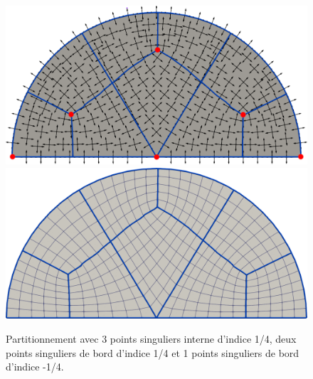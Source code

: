 \begin{figure}[!h]
\centering
\includegraphics[scale=0.24]{images/yo_3.pdf}\\[0.5cm]
\includegraphics[scale=0.24]{images/yo_4.pdf}
\caption{Partitionnement avec 3 points singuliers interne d'indice 1/4, deux points singuliers de bord d'indice 1/4 et 1 points singuliers de bord d'indice -1/4.}
\label{fig:demiDisc_sing_bord_third}
\end{figure}

